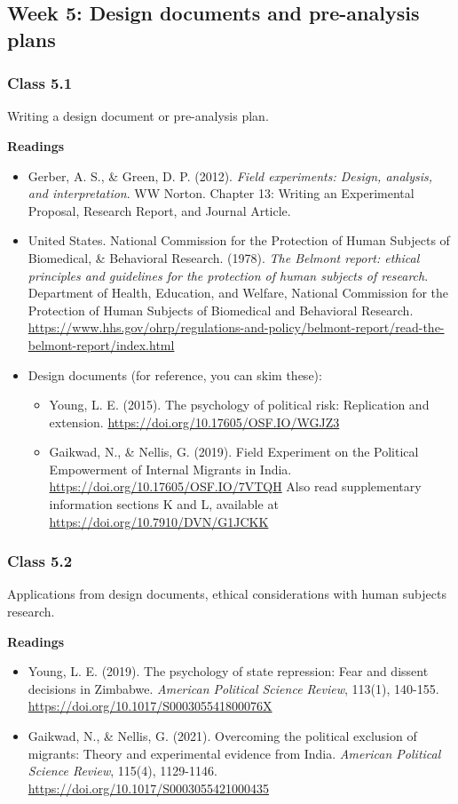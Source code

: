 \documentclass[letterpaper,12pt,parskip=full,DIV=10]{scrartcl}
\newcommand{\courseweek}[2]{\Needspace{12\baselineskip}\subsection*{Week #1: #2}}
\newcommand{\class}[2]{\Needspace{9\baselineskip}\subsubsection*{Class #1}\nopagebreak #2\par\nopagebreak\textbf{Readings}\par\nopagebreak}
\begin{document}
\courseweek{5}{Design documents and pre-analysis plans}

\class{5.1}{Writing a design document or pre-analysis plan.}

\begin{itemize}

\item Gerber, A. S., \& Green, D. P. (2012). \emph{Field experiments: Design, analysis, and interpretation}. WW Norton. Chapter 13: Writing an Experimental Proposal, Research Report, and Journal Article.

\item United States. National Commission for the Protection of Human Subjects of Biomedical, \& Behavioral Research. (1978). \emph{The Belmont report: ethical principles and guidelines for the protection of human subjects of research}. Department of Health, Education, and Welfare, National Commission for the Protection of Human Subjects of Biomedical and Behavioral Research. \url{https://www.hhs.gov/ohrp/regulations-and-policy/belmont-report/read-the-belmont-report/index.html}

\item Design documents (for reference, you can skim these):

\begin{itemize}

\item Young, L. E. (2015). The psychology of political risk: Replication and extension. \url{https://doi.org/10.17605/OSF.IO/WGJZ3}

\item Gaikwad, N., \& Nellis, G. (2019). Field Experiment on the Political Empowerment of Internal Migrants in India. \url{https://doi.org/10.17605/OSF.IO/7VTQH} Also read supplementary information sections K and L, available at \url{https://doi.org/10.7910/DVN/G1JCKK}

\end{itemize}

\end{itemize}

\class{5.2}{Applications from design documents, ethical considerations with human subjects research.}

\begin{itemize}

\item Young, L. E. (2019). The psychology of state repression: Fear and dissent decisions in Zimbabwe. \emph{American Political Science Review}, 113(1), 140-155. \url{https://doi.org/10.1017/S000305541800076X}

\item Gaikwad, N., \& Nellis, G. (2021). Overcoming the political exclusion of migrants: Theory and experimental evidence from India. \emph{American Political Science Review}, 115(4), 1129-1146. \url{https://doi.org/10.1017/S0003055421000435}

\end{itemize}
\end{document}
